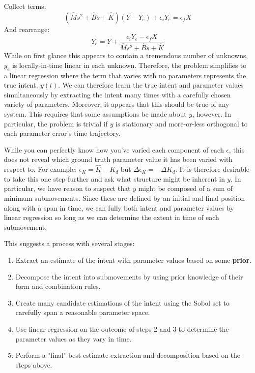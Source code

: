 \documentclass[10pt]{article}
\begin{document}
Collect terms:
\begin{equation}
(\hat{M}s^2+\hat{B}s+\hat{K})(Y-Y_e)+\epsilon_i Y_e=\epsilon_f X
\end{equation}
And rearrange:
\begin{equation}
Y_e=Y+\frac{\epsilon_i Y_e-\epsilon_f X}{\hat{M}s^2+\hat{B}s+\hat{K}}
\end{equation}
While on first glance this appears to contain a tremendous number of unknowns, $y_e$ is locally-in-time linear in each unknown. Therefore, the problem simplifies to a linear regression where the term that varies with no parameters represents the true intent, $y(t)$. We can therefore learn the true intent and parameter values simultaneously by extracting the intent many times with a carefully chosen variety of parameters. Moreover, it appears that this should be true of any system. This requires that some assumptions be made about $y$, however. In particular, the problem is trivial if $y$ is stationary and more-or-less orthogonal to each parameter error's time trajectory.

While you can perfectly know how you've varied each component of each $\epsilon$, this does not reveal which ground truth parameter value it has been varied with respect to. For example: $\epsilon_K=\hat{K}-K_d$ but $\Delta \epsilon_K=-\Delta K_d$. It is therefore desirable to take this one step further and ask what structure might be inherent in $y$. In particular, we have reason to suspect that $y$ might be composed of a sum of minimum submovements. Since these are defined by an initial and final position along with a span in time, we can fully both intent and parameter values by linear regression so long as we can determine the extent in time of each submovement.

This suggests a process with several stages:
\begin{enumerate}
  \item Extract an estimate of the intent with parameter values based on some \textbf{prior}.
  \item Decompose the intent into submovements by using prior knowledge of their form and combination rules.
  \item Create many candidate estimations of the intent using the Sobol set to carefully span a reasonable parameter space.
    \item Use linear regression on the outcome of steps 2 and 3 to determine the parameter values as they vary in time.
      \item Perform a "final" best-estimate extraction and decomposition based on the steps above.
\end{enumerate}
\end{document}
